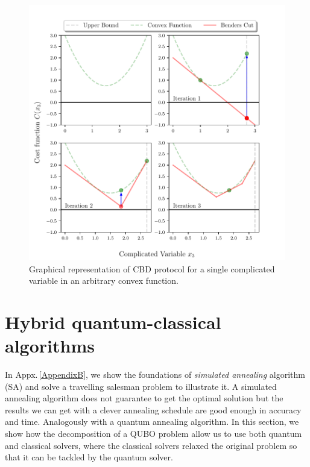 \begin{figure}[H]
\centering
\includegraphics[width=\textwidth]{Figures/BenderIlustration.pdf} 
\caption{Graphical representation of CBD protocol for a single complicated variable in an arbitrary convex function.}
\label{fig:BDIlustration}
\end{figure}
\section{Hybrid quantum-classical algorithms}
In Appx.\,\ref{AppendixB}, we show the foundations of \textit{simulated annealing} algorithm (SA) and solve a travelling salesman problem to illustrate it. A simulated annealing algorithm does not guarantee to get the optimal solution but the results we can get with a clever annealing schedule are good enough in accuracy and time. Analogously with a quantum annealing algorithm. In this section, we show how the decomposition of a QUBO problem allow us to use both quantum and classical solvers, where the classical solvers relaxed the original problem so that it can be tackled by the quantum solver.
